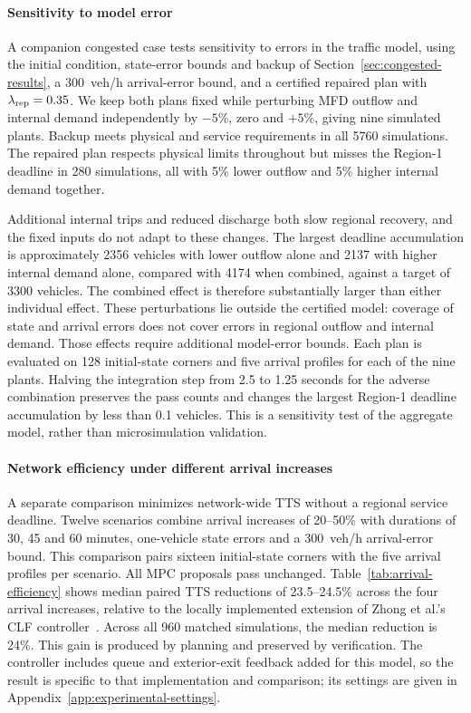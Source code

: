 \documentclass[final]{cas-sc}
\theoremstyle{definition}
\theoremstyle{plain}
\theoremstyle{definition}
\theoremstyle{plain}
\newcommand{\appref}[1]{Appendix~\ref{#1}}
\begin{document}
\paragraph{Sensitivity to model error}
\label{sec:plant-sensitivity-results}
\label{app:plant-sensitivity}
A companion congested case tests sensitivity to errors in the traffic
model, using the initial condition, state-error bounds and backup of
Section~\ref{sec:congested-results}, a 300~veh/h arrival-error bound,
and a certified repaired plan with $\lambda_{\rm rep}=0.35$. We keep
both plans fixed while perturbing MFD outflow and internal
demand independently by $-5\%$, zero and $+5\%$, giving nine simulated
plants. Backup meets physical and service requirements in all 5760
simulations. The repaired plan respects physical limits throughout but
misses the Region-1 deadline in 280 simulations, all with 5\% lower
outflow and 5\% higher internal demand together.

Additional internal trips and reduced discharge both slow regional
recovery, and the fixed inputs do not adapt to these changes. The
largest deadline accumulation is approximately 2356 vehicles with
lower outflow alone and 2137 with higher internal demand alone, compared
with 4174 when combined, against a target of 3300 vehicles. The combined
effect is therefore substantially larger than either individual effect.
These perturbations lie outside the certified model: coverage of state
and arrival errors does not cover errors in regional outflow and
internal demand. Those effects require additional model-error bounds.
Each plan is evaluated on 128 initial-state corners and five arrival
profiles for each of the nine plants. Halving the integration step
from 2.5 to 1.25 seconds for the adverse combination preserves the
pass counts and changes the largest Region-1 deadline accumulation
by less than 0.1 vehicles. This is a sensitivity test of the aggregate
model, rather than microsimulation validation.

\paragraph{Network efficiency under different arrival increases}
\label{sec:network-efficiency-comparison}
A separate comparison minimizes network-wide TTS without a regional
service deadline. Twelve scenarios combine arrival increases of
20--50\% with durations of 30, 45 and 60 minutes, one-vehicle state
errors and a 300~veh/h arrival-error bound. This comparison pairs
sixteen initial-state corners with the five arrival profiles per scenario.
All MPC proposals pass unchanged. Table~\ref{tab:arrival-efficiency}
shows median paired TTS reductions of 23.5--24.5\% across the four arrival
increases, relative to the locally implemented extension of Zhong
et al.'s CLF controller~\cite{zhong2018robust}. Across all 960 matched
simulations, the median reduction is 24\%. This gain is produced by
planning and preserved by verification. The controller includes
queue and exterior-exit feedback added for this model, so the result
is specific to that implementation and comparison; its settings are
given in \appref{app:experimental-settings}.
\end{document}
